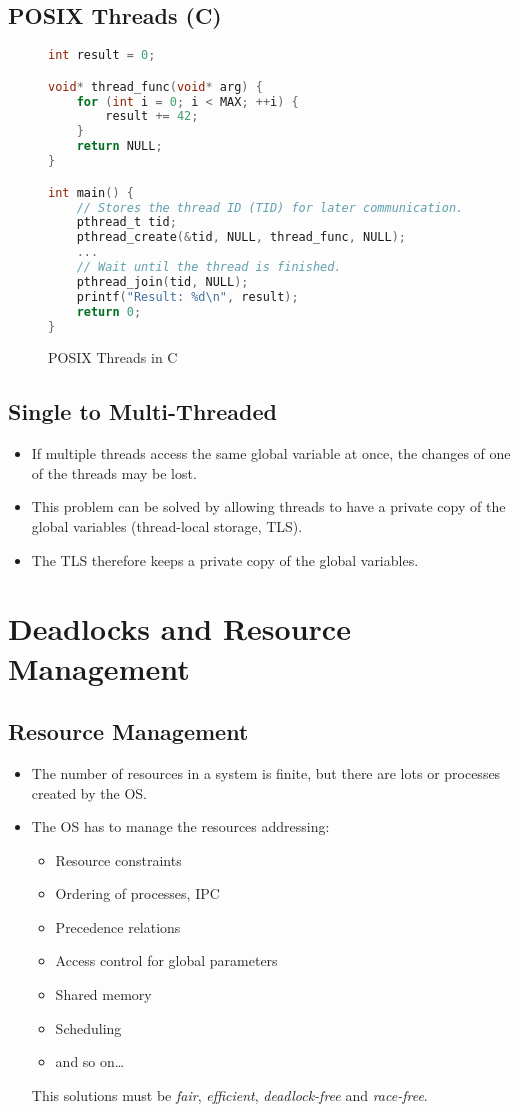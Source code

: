 	\section{POSIX Threads (C)}
		\begin{figure}[H]
			\centering
			\begin{lstlisting}[language = C]
int result = 0;

void* thread_func(void* arg) {
	for (int i = 0; i < MAX; ++i) {
		result += 42;
	}
	return NULL;
}

int main() {
	// Stores the thread ID (TID) for later communication.
	pthread_t tid;
	pthread_create(&tid, NULL, thread_func, NULL);
	...
	// Wait until the thread is finished.
	pthread_join(tid, NULL);
	printf("Result: %d\n", result);
	return 0;
}
\end{lstlisting}
			\caption{POSIX Threads in C}
		\end{figure}

	\section{Single to Multi-Threaded}
		\begin{itemize}
			\item If multiple threads access the same global variable at once, the changes of one of the threads may be lost.
			\item This problem can be solved by allowing threads to have a private copy of the global variables (thread-local storage, TLS).
			\item The TLS therefore keeps a private copy of the global variables.
		\end{itemize}

\chapter{Deadlocks and Resource Management}
	\label{c:deadlocks}

	\section{Resource Management}
		\begin{itemize}
			\item The number of resources in a system is finite, but there are lots or processes created by the OS.
			\item The OS has to manage the resources addressing:
				\begin{itemize}
					\item Resource constraints
					\item Ordering of processes, IPC
					\item Precedence relations
					\item Access control for global parameters
					\item Shared memory
					\item Scheduling
					\item and so on\dots
				\end{itemize}
				This solutions must be \textit{fair}, \textit{efficient}, \textit{deadlock-free} and \textit{race-free}.
		\end{itemize}


